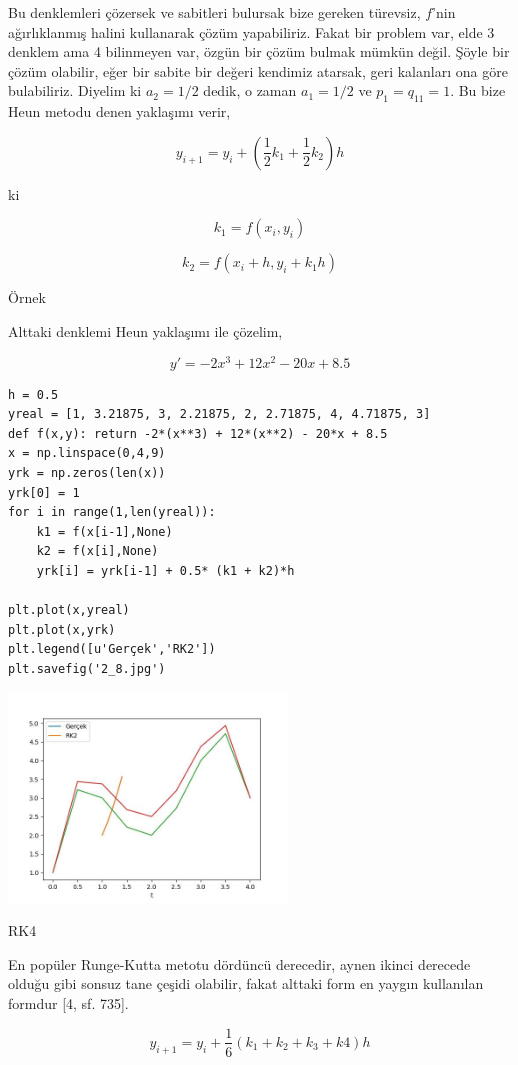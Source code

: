 \documentclass[12pt,fleqn]{article}\usepackage{../../common}
\begin{document}
Bu denklemleri çözersek ve sabitleri bulursak bize gereken türevsiz, $f$'nin
ağırlıklanmış halini kullanarak çözüm yapabiliriz. Fakat bir problem var, elde 3
denklem ama 4 bilinmeyen var, özgün bir çözüm bulmak mümkün değil. Şöyle bir
çözüm olabilir, eğer bir sabite bir değeri kendimiz atarsak, geri kalanları ona
göre bulabiliriz. Diyelim ki $a_2 = 1/2$ dedik, o zaman $a_1 = 1/2$ ve $p_1 =
q_{11} = 1$. Bu bize Heun metodu denen yaklaşımı verir,

$$
y_{i+1} = y_i + \left( \frac{1}{2} k_1 + \frac{1}{2} k_2 \right) h
$$

ki

$$
k_1 = f(x_i,y_i)
$$

$$
k_2 = f(x_i + h, y_i + k_1 h)
$$

Örnek

Alttaki denklemi Heun yaklaşımı ile çözelim,

$$
y' = -2x^3 + 12x^2 - 20x + 8.5
$$

\begin{verbatim}
h = 0.5
yreal = [1, 3.21875, 3, 2.21875, 2, 2.71875, 4, 4.71875, 3]
def f(x,y): return -2*(x**3) + 12*(x**2) - 20*x + 8.5
x = np.linspace(0,4,9)
yrk = np.zeros(len(x))
yrk[0] = 1
for i in range(1,len(yreal)):
    k1 = f(x[i-1],None)
    k2 = f(x[i],None)
    yrk[i] = yrk[i-1] + 0.5* (k1 + k2)*h
    
plt.plot(x,yreal)
plt.plot(x,yrk)
plt.legend([u'Gerçek','RK2'])
plt.savefig('2_8.jpg')
\end{verbatim}

\includegraphics[width=20em]{2_8.jpg}

RK4

En popüler Runge-Kutta metotu dördüncü derecedir, aynen ikinci derecede olduğu
gibi sonsuz tane çeşidi olabilir, fakat alttaki form en yaygın kullanılan
formdur [4, sf. 735].

$$
y_{i+1} = y_i + \frac{1}{6} (k_1 + k_2 + k_3 + k4) h
$$
\end{document}
